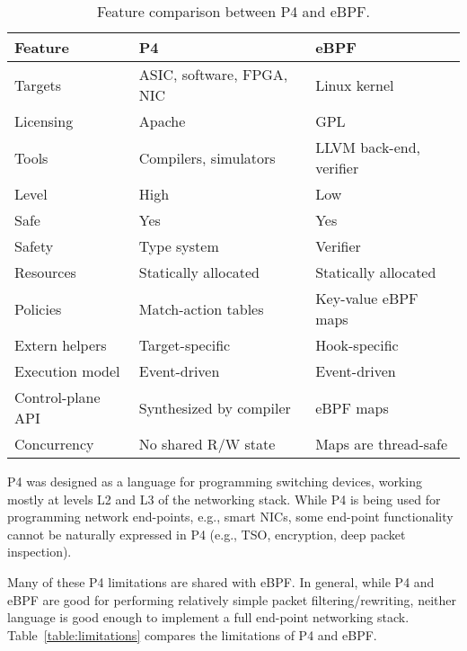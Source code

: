 \begin{table}[t]
  \footnotesize
  \begin{center}
  \begin{tabular}{|p{1.5cm}|p{2.7cm}|p{2.7cm}|} \hline
    \textbf{Feature} & \textbf{P4} & \textbf{eBPF} \\ \hline \hline
    Targets & ASIC, software, FPGA, NIC & Linux kernel \\ \hline
    Licensing & Apache & GPL \\ \hline
    Tools & Compilers, simulators & LLVM back-end, verifier \\ \hline
    Level & High & Low \\ \hline
    Safe  & Yes & Yes \\ \hline
    Safety & Type system & Verifier \\ \hline
    Resources & Statically allocated & Statically allocated \\ \hline
    Policies & Match-action tables & Key-value eBPF maps \\ \hline
    Extern helpers & Target-specific & Hook-specific \\ \hline
    Execution model & Event-driven & Event-driven \\ \hline
    Control-plane API & Synthesized by compiler & eBPF maps \\ \hline
    Concurrency & No shared R/W state & Maps are thread-safe \\ \hline
  \end{tabular}
  \caption{Feature comparison between P4 and eBPF.}\label{table:compare}
  \end{center}
\end{table}

P4 was designed as a language for programming switching devices,
working mostly at levels L2 and L3 of the networking stack.  While P4
is being used for programming network end-points, e.g., smart NICs,
some end-point functionality cannot be naturally expressed in P4
(e.g., TSO, encryption, deep packet inspection).


Many of these P4 limitations are shared with eBPF.  In general, while
P4 and eBPF are good for performing relatively simple packet
filtering/rewriting, neither language is good enough to implement a
full end-point networking stack.  Table~\ref{table:limitations}
compares the limitations of P4 and eBPF.
